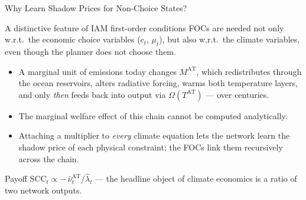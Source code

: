 \documentclass[aspectratio=169,11pt]{beamer}
\newcommand{\emphc}[1]{\textcolor{harvardcrimson}{#1}}
\begin{document}
\begin{frame}{Why Learn Shadow Prices for Non-Choice States?}
\small
\begin{block}{A distinctive feature of IAM first-order conditions}
FOCs are needed not only w.r.t.\ the economic choice variables ($c_t$, $\mu_t$), but also w.r.t.\ the \emphc{climate variables}, even though the planner does not choose them.
\end{block}

\vspace{0.15cm}
\begin{itemize}
    \item A marginal unit of emissions today changes $M^{\text{AT}}$, which redistributes through the ocean reservoirs, alters radiative forcing, warms both temperature layers, and only \emph{then} feeds back into output via $\Omega(T^{\text{AT}})$ --- over \emphc{centuries}.
    \item The marginal welfare effect of this chain cannot be computed analytically.
    \item Attaching a multiplier to \emph{every} climate equation lets the network learn the \emphc{shadow price of each physical constraint}; the FOCs link them recursively across the chain.
\end{itemize}

\vspace{0.15cm}
\begin{exampleblock}{Payoff}
$\mathrm{SCC}_t \propto -\,\hat{\nu}^{\text{AT}}_t / \hat{\lambda}_t$ --- the headline object of climate economics is a ratio of two network outputs.
\end{exampleblock}
\end{frame}
\end{document}
